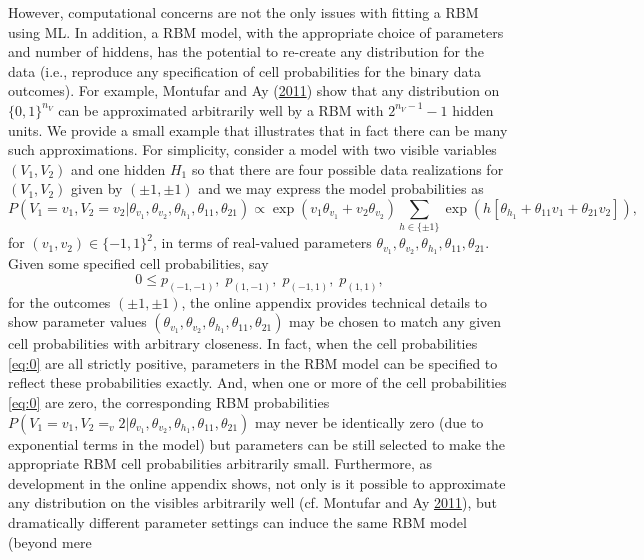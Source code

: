 \documentclass[]{article}
\theoremstyle{definition}
\newcommand{\nv}{{n_{\scriptscriptstyle V}}}
\begin{document}
However, computational concerns are not the only issues with fitting a
RBM using ML. In addition, a RBM model, with the appropriate choice of
parameters and number of hiddens, has the potential to re-create any
distribution for the data (i.e., reproduce any specification of cell
probabilities for the binary data outcomes). For example, Montufar and
Ay (\protect\hyperlink{ref-montufar2011refinements}{2011}) show that any
distribution on \(\{0, 1\}^{\nv}\) can be approximated arbitrarily well
by a RBM with \(2^{\nv-1} - 1\) hidden units. We provide a small example
that illustrates that in fact there can be many such approximations. For
simplicity, consider a model with two visible variables \((V_1,V_2)\)
and one hidden \(H_1\) so that there are four possible data realizations
for \((V_1,V_2)\) given by \((\pm 1, \pm 1)\) and we may express the
model probabilities as \[
P(V_1=v_1,V_2=v_2| \theta_{v_1}, \theta_{v_2}, \theta_{h_1}, \theta_{11},\theta_{21}) \propto  \exp\left( v_1  \theta_{v_1} + v_2 \theta_{v_2}\right) \sum_{h \in \{\pm 1\}}\exp\left( h[ \theta_{h_1}  + \theta_{11} v_1 + \theta_{21} v_2] \right),
\] for \((v_1,v_2)\in \{-1, 1\}^2\), in terms of real-valued parameters
\(\theta_{v_1}, \theta_{v_2}, \theta_{h_1}, \theta_{11},\theta_{21}\).
Given some specified cell probabilities, say \begin{equation}
\label{eq:0}
0\leq p_{(-1,-1)},\;p_{(1,-1)}, \;p_{(-1,1)},\;p_{(1,1)},
\end{equation} for the outcomes \((\pm 1, \pm 1)\), the online appendix
provides technical details to show parameter values
\((\theta_{v_1}, \theta_{v_2}, \theta_{h_1}, \theta_{11},\theta_{21})\)
may be chosen to match any given cell probabilities with arbitrary
closeness. In fact, when the cell probabilities \eqref{eq:0} are all
strictly positive, parameters in the RBM model can be specified to
reflect these probabilities exactly. And, when one or more of the cell
probabilities \eqref{eq:0} are zero, the corresponding RBM probabilities
\(P(V_1=v_1,V_2=_v2| \theta_{v_1}, \theta_{v_2}, \theta_{h_1}, \theta_{11},\theta_{21})\)
may never be identically zero (due to exponential terms in the model)
but parameters can be still selected to make the appropriate RBM cell
probabilities arbitrarily small. Furthermore, as development in the
online appendix shows, not only is it possible to approximate any
distribution on the visibles arbitrarily well (cf. Montufar and Ay
\protect\hyperlink{ref-montufar2011refinements}{2011}), but dramatically
different parameter settings can induce the same RBM model (beyond mere
\end{document}
